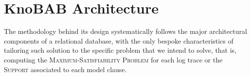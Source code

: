 \section{KnoBAB Architecture}\label{sec:karch}
The methodology behind its design systematically follows the major architectural components of a relational database, with the only bespoke characteristics of tailoring such solution to the specific problem that we intend to solve, that is, computing the \textsc{Maximum-Satisfiability Problem} for each log trace or the \textsc{Support} associated to each model clause.

